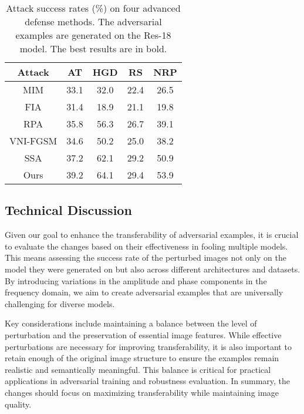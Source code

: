 \begin{table}[tb]
    \centering
    \begin{tabular}{cc*{3}{c}}
        \toprule
        Attack & AT & HGD & RS & NRP \\
        \midrule
        MIM &  33.1 & 32.0 & 22.4 & 26.5\\
        FIA &  31.4 & 18.9 & 21.1 & 19.8\\
        RPA & 35.8 & 56.3 & 26.7 & 39.1\\
        VNI-FGSM & 34.6 & 50.2 & 25.0 & 38.2 \\
        SSA & 37.2 & 62.1 & 29.2 & 50.9 \\
        Ours & 39.2 & 64.1 & 29.4 & 53.9\\
        \bottomrule
    \end{tabular}
    \caption{Attack success rates (\%) on four advanced defense methods. The adversarial examples are generated on the Res-18 model. The best results are in bold.}
    \label{tab:defense}
\end{table}

\subsection{Technical Discussion}
Given our goal to enhance the transferability of adversarial examples, it is crucial to evaluate the changes based on their effectiveness in fooling multiple models. This means assessing the success rate of the perturbed images not only on the model they were generated on but also across different architectures and datasets. By introducing variations in the amplitude and phase components in the frequency domain, we aim to create adversarial examples that are universally challenging for diverse models.

Key considerations include maintaining a balance between the level of perturbation and the preservation of essential image features. While effective perturbations are necessary for improving transferability, it is also important to retain enough of the original image structure to ensure the examples remain realistic and semantically meaningful. This balance is critical for practical applications in adversarial training and robustness evaluation. In summary, the changes should focus on maximizing transferability while maintaining image quality.



